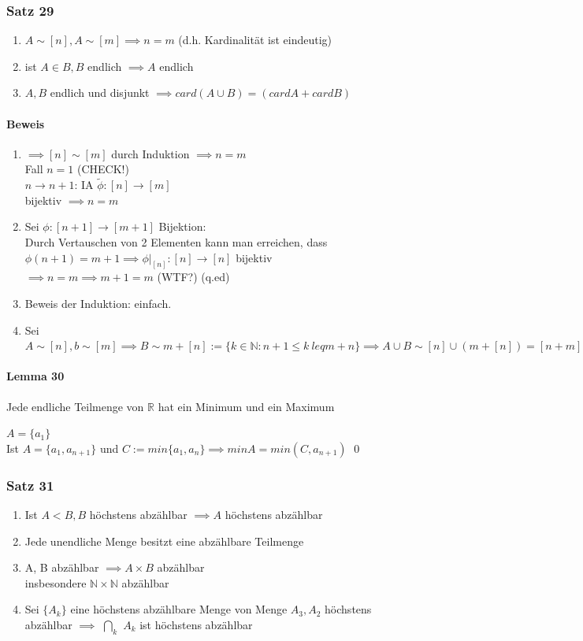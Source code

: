 \documentclass[fleqn]{scrartcl}
\renewenvironment{proof}{{\bfseries Beweis }}{\qed}
\begin{document}
\subsubsection{Satz 29}
\begin{enumerate}[1)]
\item $A\sim [n], A\sim [m] \implies n = m$ (d.h. Kardinalität ist eindeutig)
\item ist $A \in B, B$ endlich $\implies A$ endlich
\item $A, B$ endlich und disjunkt $\implies card(A\cup B) = (cardA + cardB)$
\end{enumerate}
\paragraph{Beweis}
\begin{enumerate}[1)]
\item $\implies [n] \sim [m]$ durch Induktion $\implies n = m$\\Fall $n = 1$ (CHECK!)\\$n\rightarrow n + 1$: IA $\tilde{\phi}:[n]\rightarrow [m]$\\bijektiv $\implies n = m$\item Sei $\phi:[n+1]\rightarrow[m+1]$ Bijektion:\\Durch Vertauschen von 2 Elementen kann man erreichen, dass $\phi (n + 1) = m+1 \implies \phi |_{[n]}:[n]\rightarrow [n]$ bijektiv $\implies n = m \implies  m + 1 = m$ (WTF?) (q.ed)
\item Beweis der Induktion: einfach.
\item Sei $A \sim [n], b \sim [m] \implies B \sim m + [n] := \{ k \in \mathbb{N}: n + 1 \leq k \ leq m + n \} \implies A \cup B \sim [n] \cup (m + [n]) = [n + m]$
\end{enumerate}
\paragraph{Lemma 30} Jede endliche Teilmenge von $\mathbb{R}$ hat ein Minimum und ein Maximum

\begin{proof}
$A = \{a_1\}$\\Ist $A = \{a_1, a_{n+1}\}$ und $C:= min\{a_1, a_n\} \implies minA = min(C, a_{n+1})$
\end{proof}
\subsubsection{Satz 31}
\begin{enumerate}[1)]
\item Ist $A<B,B$ höchstens abzählbar $\implies A$ höchstens abzählbar
\item Jede unendliche Menge besitzt eine abzählbare Teilmenge
\item A, B abzählbar $\implies A \times B$ abzählbar\\ insbesondere $\mathbb{N} \times \mathbb{N}$ abzählbar
\item Sei $\{A_k\}$ eine höchstens abzählbare Menge von Menge $A_3, A_2$ höchstens abzählbar $\implies$ $\bigcap_k$ $A_k$ ist höchstens abzählbar
\end{enumerate}
\end{document}

